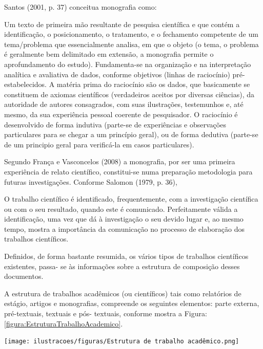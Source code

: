 \documentclass[a4paper,12pt]{article}  %
\begin{document}
\begin{ElementosTextuais}
\begin{Desenvolvimento}
Santos (2001, p. 37) conceitua monografia como:
\begin{citacaodireta}
Um texto de primeira mão resultante de pesquisa científica e que contém a identificação, o posicionamento, o tratamento, e o fechamento competente de um tema/problema que essencialmente analisa, em que o objeto (o tema, o problema é geralmente bem delimitado em extensão, a monografia permite o aprofundamento do estudo). Fundamenta-se na organização e na interpretação analítica e avaliativa de dados, conforme objetivos (linhas de raciocínio) pré-estabelecidos. A matéria prima do raciocínio são os dados, que basicamente se constituem de axiomas científicos (verdadeiros aceitos por diversas ciências), da autoridade de autores consagrados, com suas ilustrações, testemunhos e, até mesmo, da sua experiência pessoal coerente de pesquisador. O raciocínio é desenvolvido de forma indutiva (parte-se de experiências e observações particulares para se chegar a um princípio geral), ou de forma dedutiva (parte-se de um principio geral para verificá-la em casos particulares).
\end{citacaodireta}

Segundo França e Vasconcelos (2008) a monografia, por ser uma primeira experiência de relato científico, constitui-se numa preparação metodologia para futuras investigações. Conforme Salomon (1979, p. 36),

\begin{citacaodireta}
O trabalho científico é identificado, frequentemente, com a investigação científica ou com o seu resultado, quando este é comunicado. Perfeitamente válida a identificação, uma vez que dá à investigação o seu devido lugar e, ao mesmo tempo, mostra a importância da comunicação no processo de elaboração dos trabalhos científicos.
\end{citacaodireta}

Definidos, de forma bastante resumida, os vários tipos de trabalhos científicos existentes, passa- se às informações sobre a estrutura de composição desses documentos.

A estrutura de trabalhos acadêmicos (ou científicos) tais como relatórios de estágio, artigos e monografias, compreende os seguintes elementos: parte externa, pré-textuais, textuais e pós- textuais, conforme mostra a Figura: \ref{figura:EstruturaTrabalhoAcademico}.

\begin{figura}[h!]
  \centering
  \addfigura
  \texttt{[image: ilustracoes/figuras/Estrutura de trabalho acadêmico.png]}
  \label{figura:EstruturaTrabalhoAcademico}
\end{figura}


\end{Desenvolvimento}
\end{ElementosTextuais}
\end{document}
